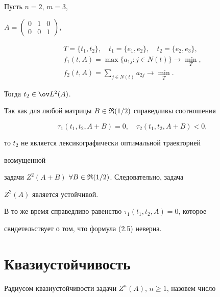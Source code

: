 \begin{exams} 


Пусть $n=2$, $m=3$, 


$A=\begin{pmatrix}0 & 1 & 0 \\ 0 & 0 & 1\end{pmatrix}$, 


\begin{gather*} 


T=\{t_1,t_2\},\quad t_1=\{e_1,e_2\},\quad t_2=\{e_2,e_3\},\\ 


f_1(t,A)=\max\{a_{1j}:j\in N(t)\}\to\min_T,\\ 


f_2(t,A)=\sum_{j\in N(t)}a_{2j}\to\min_T. 


\end{gather*} 


Тогда $t_2\in\ov L^2(A)$. 


 


Так как для любой матрицы $B\in\frak R(1/2)$ справедливы соотношения 


$$ 


\tau_1(t_1,t_2,A+B)=0,\quad 


\tau_2(t_1,t_2,A+B)<0, 


$$ 


то $t_2$ не является лексикографически оптимальной траекторией 


возмущенной 


задачи $Z^2(A+B)$ $\forall B\in\frak R(1/2)$. Следовательно, задача 


$Z^2(A)$ является устойчивой. 


 


В то же время справедливо равенство $\tau_1(t_1,t_2,A)=0$, которое 


свидетельствует о том, что формула (2.5) неверна. 


\end{exams} 


 


\section{Квазиустойчивость} 


 


Радиусом квазиустойчивости задачи $Z^n(A)$, $n\ge 1$, назовем число 



